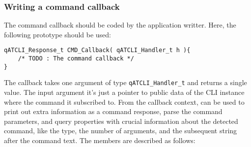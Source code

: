 \subsubsection{Writing a command callback}
The command callback should be coded by the application writter. Here, the following prototype should be used:
\medskip

\begin{lstlisting}[style=CStyle]
qATCLI_Response_t CMD_Callback( qATCLI_Handler_t h ){
    /* TODO : The command callback */
}
\end{lstlisting}

The callback takes one argument of type \lstinline{qATCLI_Handler_t} and returns a single value.
\medskip
The input argument it's just a pointer to public data of the CLI instance where the command it subscribed to. From the callback context, can be used to print out extra information as a command response, parse the command parameters, and query properties with crucial information about the detected command, like the type, the number of arguments, and the subsequent string after the command text. The members are described as follows:

